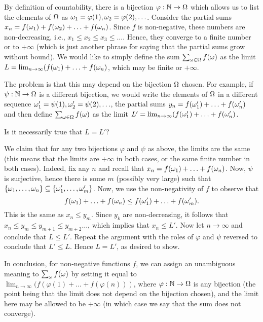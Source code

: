 \documentclass[preprint,  11pt]{amsart}
\renewcommand\phi{{\varphi}}
\begin{document}
 By definition of countability, there is a bijection $\phi:\N\to \Ome$ which allows us to list the elements of $\Omega$ as $\ome_{1}=\phi(1),\ome_{2}=\phi(2),\ldots$. Consider the partial sums $x_{n}=f(\omega_{1})+f(\omega_{2})+\ldots +f(\omega_{n})$. Since $f$ is non-negative, these numbers are non-decreasing, i.e., $x_{1}\le x_{2}\le x_{3}\le \ldots$. Hence, they converge to a finite number or to $+\infty$ (which is just another phrase for saying that the partial sums grow without bound). We would like to simply define the sum $\sum_{\omega\in \Omega}f(\omega)$ as the limit $L=\lim_{n\rightarrow \infty}(f(\omega_{1})+\ldots +f(\omega_{n})$, which may be finite or $+\infty$.

The problem is that this may depend on the bijection $\Omega$ chosen. For example, if $\psi:\mathbb{N}\rightarrow \Omega$ is a different bijection, we would write the elements of $\Omega$ in a different sequence $\omega_{1}'=\psi(1),\omega_{2}'=\psi(2),\ldots$, the partial sums $y_{n}=f(\omega_{1}')+\ldots +f(\omega_{n}')$ and then define $\sum_{\omega\in \Omega}f(\omega)$ as the limit $L'=\lim_{n\rightarrow \infty}(f(\omega_{1}')+\ldots +f(\omega_{n}')$.

Is it necessarily true that $L=L'$?

 We claim that for any two bijections $\phi$ and $\psi$ as above, the limits are the same (this means that the limits are $+\infty$ in both cases, or the same finite number in both cases). Indeed, fix any $n$ and recall that $x_{n}=f(\omega_{1})+\ldots +f(\omega_{n})$. Now, $\psi$ is surjective, hence there is some $m$ (possibly very large) such that $\{\omega_{1},\ldots,\omega_{n}\}\subseteq \{\omega_{1}',\ldots ,\omega_{m}'\}$. Now, we use the non-negativity of $f$ to observe that
$$
f(\omega_{1})+\ldots +f(\omega_{n})\le f(\omega_{1}')+\ldots +f(\omega_{m}').
$$
This is the same as $x_{n}\le y_{m}$. Since $y_{k}$ are non-decreasing, it follows that $x_{n}\le y_{m}\le y_{m+1}\le y_{m+2}\ldots$, which implies that $x_{n}\le L'$. Now let $n\to \infty$ and conclude that $L\le L'$. Repeat the argument with the roles of $\phi$ and $\psi$ reversed to conclude that $L'\le L$. Hence $L=L'$, as desired to show.

In conclusion, for non-negative functions $f$, we can assign an unambiguous meaning to $\sum_{\omega}f(\omega)$ by setting it equal to $\lim_{n\to \infty}(f(\phi(1)+\ldots +f(\phi(n)))$, where $\phi:\N\to \Ome$ is any bijection (the point being that the limit does not depend on the bijection chosen), and the limit here may be allowed to be $+\infty$ (in which case we say that the sum does not converge).
\end{document}

